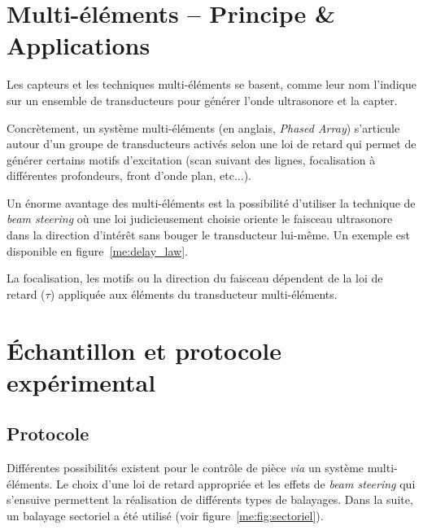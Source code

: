 \section{Multi-éléments -- Principe \& Applications}

Les capteurs et les techniques multi-éléments se basent, comme leur nom l'indique sur un ensemble de transducteurs pour générer l'onde ultrasonore et la capter.

Concrètement, un système multi-éléments (en anglais, \textit{Phased Array}) s'articule autour d'un groupe de transducteurs activés selon une loi de retard qui permet de générer certains motifs d'excitation (scan suivant des lignes, focalisation à différentes profondeurs, front d'onde plan, etc...).

Un énorme avantage des multi-éléments est la possibilité d'utiliser la technique de \textit{beam steering} où une loi judicieusement choisie oriente le faisceau ultrasonore dans la direction d'intérêt sans bouger le transducteur lui-même. Un exemple est disponible en figure~\ref{me:delay_law}.

\begin{figurehere}
    \centering
    \caption{La focalisation, les motifs ou la direction du faisceau dépendent de la loi de retard ($\tau$) appliquée aux éléments du transducteur multi-éléments.}
    \label{me:delay_law}
\end{figurehere}

\section{Échantillon et protocole expérimental}

\subsection{Protocole}

Différentes possibilités existent pour le contrôle de pièce \textit{via} un système multi-éléments. Le choix d'une loi de retard appropriée et les effets de \textit{beam steering} qui s'ensuive permettent la réalisation de différents types de balayages. Dans la suite, un balayage sectoriel a été utilisé (voir figure~\ref{me:fig:sectoriel}).

